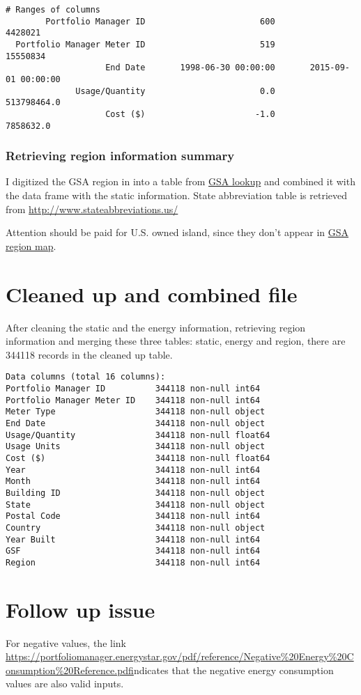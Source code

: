 \documentclass[12pt]{article}
\begin{document}
\begin{itemize}
\begin{verbatim}
# Ranges of columns
        Portfolio Manager ID                       600                   4428021
  Portfolio Manager Meter ID                       519                  15550834
                    End Date       1998-06-30 00:00:00       2015-09-01 00:00:00
              Usage/Quantity                       0.0               513798464.0
                    Cost ($)                      -1.0                 7858632.0

\end{verbatim}

\end{itemize}

\subsubsection{Retrieving region information summary}
I digitized the GSA region in into a table from
\href{http://www.gsa.gov/portal/category/22227}{GSA lookup} and
combined it with the data frame with the static information. State
abbreviation table is retrieved from
\url{http://www.stateabbreviations.us/}

Attention should be paid for U.S. owned island, since they don't
appear in \href{http://www.gsa.gov/graphics/pbs/RWAmap.pdf}{GSA region
  map}.
\section{Cleaned up and combined file}
After cleaning the static and the energy information, retrieving
region information and merging these three tables: static, energy and
region, there are 344118 records in the cleaned up table.
\begin{verbatim}
Data columns (total 16 columns):
Portfolio Manager ID          344118 non-null int64
Portfolio Manager Meter ID    344118 non-null int64
Meter Type                    344118 non-null object
End Date                      344118 non-null object
Usage/Quantity                344118 non-null float64
Usage Units                   344118 non-null object
Cost ($)                      344118 non-null float64
Year                          344118 non-null int64
Month                         344118 non-null int64
Building ID                   344118 non-null object
State                         344118 non-null object
Postal Code                   344118 non-null int64
Country                       344118 non-null object
Year Built                    344118 non-null int64
GSF                           344118 non-null int64
Region                        344118 non-null int64
\end{verbatim}
\section{Follow up issue}
For negative values, the link
\url{https://portfoliomanager.energystar.gov/pdf/reference/Negative%20Energy%20Consumption%20Reference.pdf}indicates that the negative energy consumption values are also valid inputs.


\newpage
 
\end{document}
